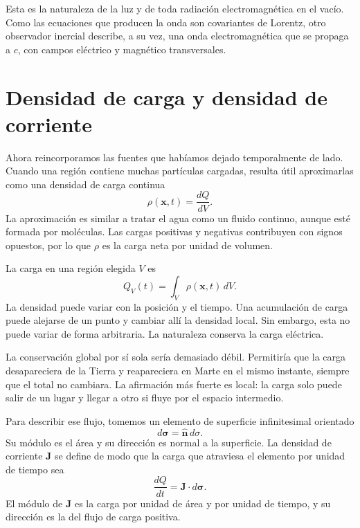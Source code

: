 Esta es la naturaleza de la luz y de toda radiación electromagnética en el vacío. Como las ecuaciones que producen la onda son covariantes de Lorentz, otro observador inercial describe, a su vez, una onda electromagnética que se propaga a \(c\), con campos eléctrico y magnético transversales.

\section{Densidad de carga y densidad de corriente}

Ahora reincorporamos las fuentes que habíamos dejado temporalmente de lado. Cuando una región contiene muchas partículas cargadas, resulta útil aproximarlas como una densidad de carga continua
\begin{equation}
\rho(\mathbf x,t)=\frac{dQ}{dV}.
\end{equation}
La aproximación es similar a tratar el agua como un fluido continuo, aunque esté formada por moléculas. Las cargas positivas y negativas contribuyen con signos opuestos, por lo que \(\rho\) es la carga neta por unidad de volumen.

La carga en una región elegida \(V\) es
\begin{equation}
Q_V(t)=\int_V\rho(\mathbf x,t)\,dV.
\label{eq:charge-volume}
\end{equation}
La densidad puede variar con la posición y el tiempo. Una acumulación de carga puede alejarse de un punto y cambiar allí la densidad local. Sin embargo, esta no puede variar de forma arbitraria. La naturaleza conserva la carga eléctrica.

La conservación global por sí sola sería demasiado débil. Permitiría que la carga desapareciera de la Tierra y reapareciera en Marte en el mismo instante, siempre que el total no cambiara. La afirmación más fuerte es local: la carga solo puede salir de un lugar y llegar a otro si fluye por el espacio intermedio.

Para describir ese flujo, tomemos un elemento de superficie infinitesimal orientado
\begin{equation}
d\boldsymbol\sigma=\widehat{\mathbf n}\,d\sigma.
\end{equation}
Su módulo es el área y su dirección es normal a la superficie. La densidad de corriente \(\mathbf J\) se define de modo que la carga que atraviesa el elemento por unidad de tiempo sea
\begin{equation}
\frac{dQ}{dt}=\mathbf J\cdot d\boldsymbol\sigma.
\label{eq:current-flux-element}
\end{equation}
El módulo de \(\mathbf J\) es la carga por unidad de área y por unidad de tiempo, y su dirección es la del flujo de carga positiva.

